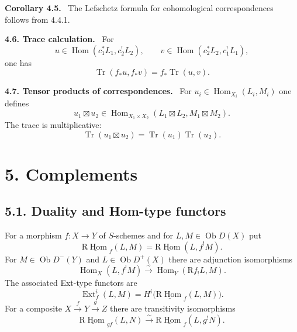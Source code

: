 \documentclass[11pt]{article}
\theoremstyle{plain}
\theoremstyle{definition}
\theoremstyle{remark}
\newenvironment{statement}[1]{\par\medskip\noindent\textbf{#1.}\ }{\par\medskip}
\DeclareMathOperator{\Hom}{Hom}
\DeclareMathOperator{\Ext}{Ext}
\DeclareMathOperator{\ob}{Ob}
\DeclareMathOperator{\Tr}{Tr}
\newcommand{\R}{\mathrm R}
\begin{document}
\begin{statement}{Corollary 4.5}
The Lefschetz formula for cohomological correspondences follows from 4.4.1.
\end{statement}

\begin{statement}{4.6. Trace calculation}
For
\[
   u\in\Hom(c_1^*L_1,c_2^!L_2),
   \qquad
   v\in\Hom(c_2^*L_2,c_1^!L_1),
\]
one has
\begin{equation}
   \Tr(f_*u,f_*v)=f_*\Tr(u,v).
   \tag{4.6.1}
\end{equation}
\end{statement}

\begin{statement}{4.7. Tensor products of correspondences}
For $u_i\in\Hom_{X_i}(L_i,M_i)$ one defines
\[
   u_1\boxtimes u_2\in
   \Hom_{X_1\times X_2}(L_1\boxtimes L_2,M_1\boxtimes M_2).
\]
The trace is multiplicative:
\begin{equation}
   \Tr(u_1\boxtimes u_2)=\Tr(u_1)\Tr(u_2).
   \tag{4.7.1}
\end{equation}
\end{statement}

\section*{5. Complements}

\subsection*{5.1. Duality and Hom-type functors}
For a morphism $f:X\to Y$ of $S$-schemes and for $L,M\in\ob D(X)$ put
\begin{equation}
   \underline{\R\Hom}_f(L,M)=\underline{\R\Hom}(L,f^!M).
   \tag{5.1.1}
\end{equation}
For $M\in\ob D^{-}(Y)$ and $L\in\ob D^{+}(X)$ there are adjunction isomorphisms
\begin{equation}
   \Hom_X(L,f^!M)\xrightarrow{\sim}\Hom_Y(\R f_!L,M).
   \tag{5.1.2}
\end{equation}
The associated Ext-type functors are
\begin{equation}
   \Ext^i_f(L,M)=H^i\bigl(\underline{\R\Hom}_f(L,M)\bigr).
   \tag{5.2.1}
\end{equation}
For a composite $X\xrightarrow{f}Y\xrightarrow{g}Z$ there are transitivity isomorphisms
\begin{equation}
   \underline{\R\Hom}_{gf}(L,N)\xrightarrow{\sim}
   \underline{\R\Hom}_f(L,g^!N).
   \tag{5.3.1}
\end{equation}
\end{document}
